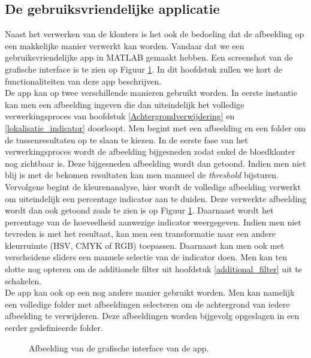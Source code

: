 \documentclass[a4paper,kulak]{kulakarticle}
\begin{document}
\subsection{De gebruiksvriendelijke applicatie}
Naast het verwerken van de klonters is het ook de bedoeling dat de afbeelding op een makkelijke manier verwerkt kan worden. Vandaar dat we een gebruiksvriendelijke app in MATLAB gemaakt hebben.
Een screenshot van de grafische interface is te zien op Figuur \ref{figuur interface}. In dit hoofdstuk zullen we kort de functionaliteiten van deze app beschrijven.\\
De app kan op twee verschillende manieren gebruikt worden. In eerste instantie kan men een afbeelding ingeven die dan uiteindelijk het volledige verwerkingsproces van hoofdstuk \ref{Achtergrondverwijdering} en \ref{lokalisatie_indicator} doorloopt. Men begint met een afbeelding en een folder om de tussenresultaten op te slaan te kiezen. In de eerste fase van het verwerkingsproces wordt de afbeelding bijgesneden zodat enkel de bloedklonter nog zichtbaar is. Deze bijgesneden afbeelding wordt dan getoond. Indien men niet blij is met de bekomen resultaten kan men manueel de \textit{threshold} bijsturen. Vervolgens begint de kleurenanalyse, hier wordt de volledige afbeelding verwerkt om uiteindelijk een percentage indicator aan te duiden. Deze verwerkte afbeelding wordt dan ook getoond zoals te zien is op Figuur \ref{figuur interface}. Daarnaast wordt het percentage van de hoeveelheid aanwezige indicator weergegeven. Indien men niet tevreden is met het resultaat, kan men een transformatie naar een andere kleurruimte (HSV, CMYK of RGB) toepassen. Daarnaast kan men ook met verscheidene sliders een manuele selectie van de indicator doen. Men kan ten slotte nog opteren om de additionele filter uit hoofdstuk \ref{additional_filter} uit te schakelen. \\
De app kan ook op een nog andere manier gebruikt worden. Men kan namelijk een volledige folder met afbeeldingen selecteren om de achtergrond van iedere afbeelding te verwijderen. Deze afbeeldingen worden bijgevolg opgeslagen in een eerder gedefinieerde folder.

\begin{figure}[H]
	\centering
	
	\caption{Afbeelding van de grafische interface van de app.}
	\label{figuur interface}
\end{figure}
\end{document}
